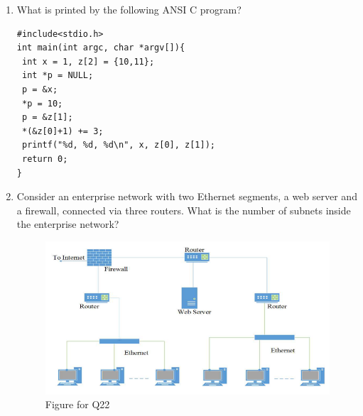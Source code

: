 \begin{enumerate}
\hfill{}

\item What is printed by the following ANSI C program?  

\begin{verbatim}
#include<stdio.h>
int main(int argc, char *argv[]){
 int x = 1, z[2] = {10,11};
 int *p = NULL;
 p = &x;
 *p = 10;
 p = &z[1];
 *(&z[0]+1) += 3;
 printf("%d, %d, %d\n", x, z[0], z[1]);
 return 0;
}
\end{verbatim}

\begin{enumerate}
\end{enumerate}

\hfill{}

\item Consider an enterprise network with two Ethernet segments, a web server and a firewall, connected via three routers. What is the number of subnets inside the enterprise network?  
\begin{figure}[H]
\centering
\includegraphics[width=0.8\columnwidth]{figs/q22.png}
\caption{Figure for Q22}
\label{fig:q22}
\end{figure}
\begin{enumerate}
\end{enumerate}


\end{enumerate}
